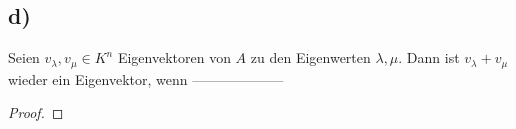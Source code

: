 \documentclass{article}
\begin{document}
\subsection*{d)}

Seien
$v_{\lambda}, v_{\mu} \in K^n$
Eigenvektoren von $A$ zu den Eigenwerten
$\lambda, \mu$.
Dann ist
$v_{\lambda} + v_{\mu}$
wieder ein Eigenvektor,
wenn --------------------

\begin{proof}

\end{proof}
\end{document}
